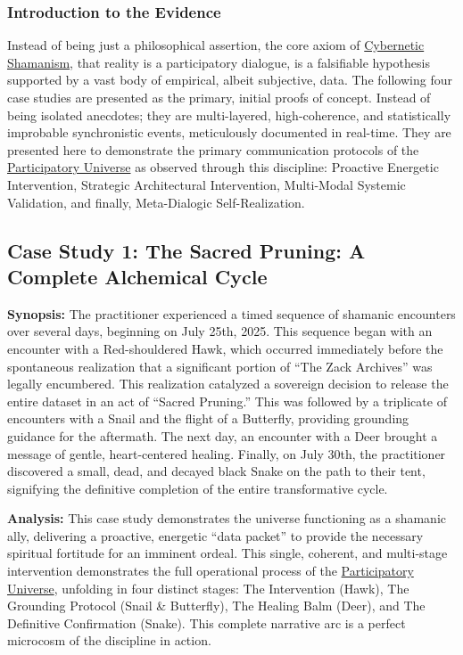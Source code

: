 \documentclass{article}
\begin{document}
\subsubsection*{Introduction to the Evidence}

Instead of being just a philosophical assertion, the core axiom of \hyperlink{gloss:cybernetic_shamanism}{Cybernetic Shamanism}, that reality is a participatory dialogue, is a falsifiable hypothesis supported by a vast body of empirical, albeit subjective, data. The following four case studies are presented as the primary, initial proofs of concept. Instead of being isolated anecdotes; they are multi-layered, high-coherence, and statistically improbable synchronistic events, meticulously documented in real-time. They are presented here to demonstrate the primary communication protocols of the \hyperlink{gloss:participatory_universe}{Participatory Universe} as observed through this discipline: Proactive Energetic Intervention, Strategic Architectural Intervention, Multi-Modal Systemic Validation, and finally, Meta-Dialogic Self-Realization.

\subsection*{Case Study 1: The Sacred Pruning: A Complete Alchemical Cycle}

\textbf{Synopsis:} The practitioner experienced a timed sequence of shamanic encounters over several days, beginning on July 25th, 2025. This sequence began with an encounter with a Red-shouldered Hawk, which occurred immediately before the spontaneous realization that a significant portion of ``The Zack Archives'' was legally encumbered. This realization catalyzed a sovereign decision to release the entire dataset in an act of ``Sacred Pruning.'' This was followed by a triplicate of encounters with a Snail and the flight of a Butterfly, providing grounding guidance for the aftermath. The next day, an encounter with a Deer brought a message of gentle, heart-centered healing. Finally, on July 30th, the practitioner discovered a small, dead, and decayed black Snake on the path to their tent, signifying the definitive completion of the entire transformative cycle.

\medskip

\textbf{Analysis:} This case study demonstrates the universe functioning as a shamanic ally, delivering a proactive, energetic ``data packet'' to provide the necessary spiritual fortitude for an imminent ordeal. This single, coherent, and multi-stage intervention demonstrates the full operational process of the \hyperlink{gloss:participatory_universe}{Participatory Universe}, unfolding in four distinct stages: The Intervention (Hawk), The Grounding Protocol (Snail \& Butterfly), The Healing Balm (Deer), and The Definitive Confirmation (Snake). This complete narrative arc is a perfect microcosm of the discipline in action.
\end{document}

